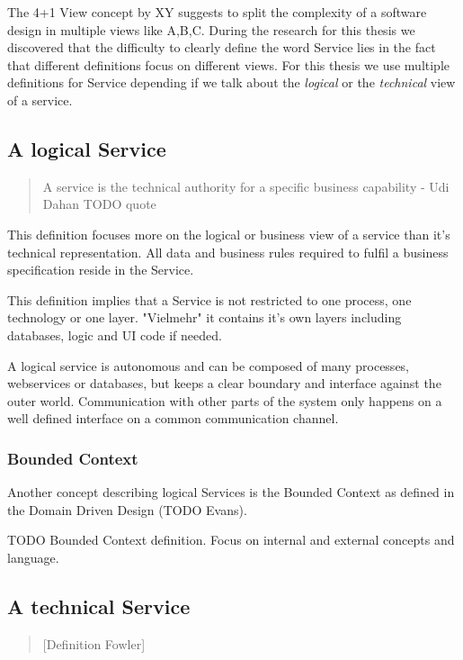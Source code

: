 \documentclass[hsr-ba,english]{hgbthesis}
\begin{document}
The 4+1 View concept by XY suggests to split the complexity of a software design in multiple views like A,B,C. During the research for this thesis we discovered that the difficulty to clearly define the word Service lies in the fact that different definitions focus on different views. For this thesis we use multiple definitions for Service depending if we talk about the \textit{logical} or the \textit{technical} view of a service.

\subsection{A logical Service}

\begin{quotation}
A service is the technical authority for a specific business capability - Udi Dahan TODO quote
\end{quotation}
   
This definition focuses more on the logical or business view of a service than it's technical representation. All data and business rules required to fulfil a business specification reside in the Service. 

This definition implies that a Service is not restricted to one process, one technology or one layer. "Vielmehr" it contains it's own layers including databases, logic and UI code if needed. 

A logical service is autonomous and can be composed of many processes, webservices or databases, but keeps a clear boundary and interface against the outer world. Communication with other parts of the system only happens on a well defined interface on a common communication channel.

\subsubsection{Bounded Context}

Another concept describing logical Services is the Bounded Context as defined in the Domain Driven Design (TODO Evans). 

TODO Bounded Context definition. Focus on internal and external concepts and language.

\subsection{A technical Service}

\begin{quotation}
	[Definition Fowler]
\end{quotation}
\end{document}
